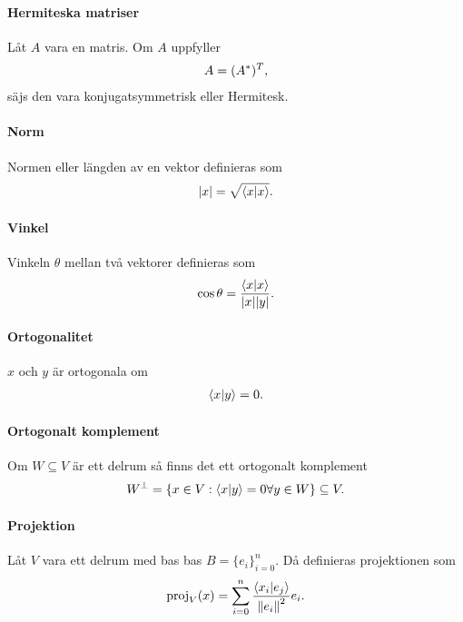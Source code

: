 \paragraph{Hermiteska matriser}
Låt $A$ vara en matris. Om $A$ uppfyller
\begin{align*}
	A = (A^{*})^{T},
\end{align*}
säjs den vara konjugatsymmetrisk eller Hermitesk.

\paragraph{Norm}
Normen eller längden av en vektor definieras som
\begin{align*}
	\abs{x} = \sqrt{\bra{x}\ket{x}}.
\end{align*}

\paragraph{Vinkel}
Vinkeln $\theta$ mellan två vektorer definieras som
\begin{align*}
	\cos{\theta} = \frac{\bra{x}\ket{x}}{\abs{x}\abs{y}}.
\end{align*}

\paragraph{Ortogonalitet}
$x$ och $y$ är ortogonala om
\begin{align*}
	\bra{x}\ket{y} = 0.
\end{align*}

\paragraph{Ortogonalt komplement}
Om $W\subseteq V$ är ett delrum så finns det ett ortogonalt komplement
\begin{align*}
	W^{\perp} = \left\{x\in V: \bra{x}\ket{y} = 0\forall y\in W\right\} \subseteq V.
\end{align*}

\paragraph{Projektion}
Låt $V$ vara ett delrum med bas bas $B = \{e_{i}\}_{i= 0}^{n}$. Då definieras projektionen som
\begin{align*}
	\text{proj}_{V}(x) = \sum\limits_{i = 0}^{n}\frac{\bra{x_{i}}\ket{e_{j}}}{\norm{e_{i}}^{2}}e_{i}.
\end{align*}

